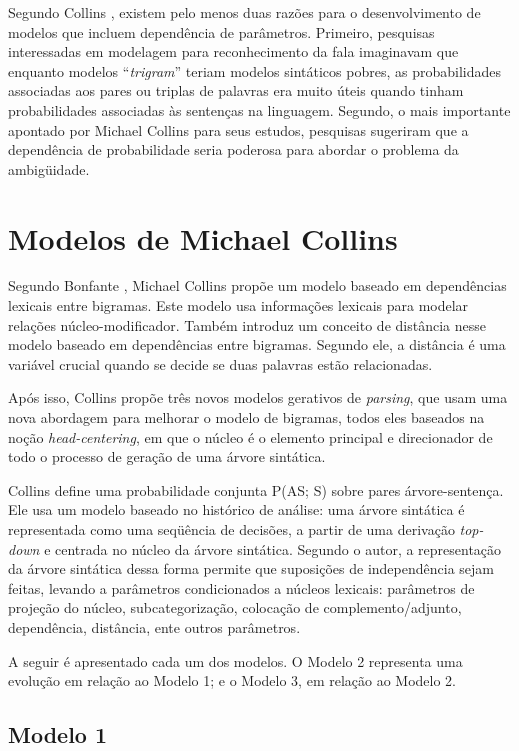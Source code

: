 Segundo Collins \cite{collins99}, existem pelo menos duas razões para o desenvolvimento de modelos que incluem dependência de parâmetros. Primeiro, pesquisas interessadas em modelagem para reconhecimento da fala imaginavam que enquanto modelos ``\emph{trigram}'' teriam modelos sintáticos pobres, as probabilidades associadas aos pares ou triplas de palavras era muito úteis quando tinham probabilidades associadas às sentenças na linguagem. Segundo, o mais importante apontado por Michael Collins para seus estudos, pesquisas sugeriram que a dependência de probabilidade seria poderosa para abordar o problema da ambigüidade.

\section{Modelos de Michael Collins}
\label{sec:modelos_collins}

Segundo Bonfante \cite{bonfante03}, Michael Collins propõe um modelo baseado em dependências lexicais entre bigramas. Este modelo usa informações lexicais para modelar relações núcleo-modificador. Também introduz um conceito de distância nesse modelo baseado em dependências entre bigramas. Segundo ele, a distância é uma variável crucial quando se decide se duas palavras estão relacionadas.

Após isso, Collins \cite{collins97} propõe três novos modelos gerativos de \emph{parsing}, que usam uma nova abordagem para melhorar o modelo de bigramas, todos eles baseados na noção \emph{head-centering}, em que o núcleo é o elemento principal e direcionador de todo o processo de geração de uma árvore sintática.

Collins define uma probabilidade conjunta P(AS; S) sobre pares árvore-sentença. Ele usa um modelo baseado no histórico de análise: uma árvore sintática é representada como uma seqüência de decisões, a partir de uma derivação \emph{top-down} e centrada no núcleo da árvore sintática. Segundo o autor, a representação da árvore sintática dessa forma permite que suposições de independência sejam feitas, levando a parâmetros condicionados a núcleos lexicais: parâmetros de projeção do núcleo, subcategorização, colocação de complemento/adjunto, dependência, distância, ente outros parâmetros.

A seguir é apresentado cada um dos modelos. O Modelo 2 representa uma evolução em relação ao Modelo 1; e o Modelo 3, em relação ao Modelo 2.

\subsection{Modelo 1}
\label{sub:modelo1}

